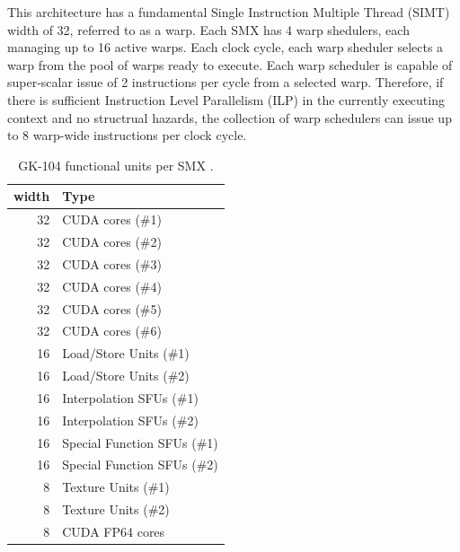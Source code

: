 \documentclass[11pt, oneside, a4paper]{article}
\begin{document}
This architecture has a fundamental Single Instruction Multiple Thread (SIMT) width of 32, referred to as a warp.
Each SMX has 4 warp shedulers, each managing up to 16 active warps. Each clock cycle, each warp sheduler selects a warp from the pool of warps ready to execute. Each warp scheduler is capable of super-scalar issue of 2 instructions per cycle from a selected warp. Therefore, if there is sufficient Instruction Level Parallelism (ILP) in the currently executing context and no structrual hazards, the collection of warp schedulers can issue up to 8 warp-wide instructions per clock cycle.


\begin{table}[tb]
	\caption{GK-104 functional units per SMX \cite{Anand}.}
	\label{tab:funcunits}
	\begin{center}
		\begin{tabular}{rl}
		\hline

		\hline
		\textbf{width} & \textbf{Type} \\
		\hline
			32 & CUDA cores (\#1) \\
			32 & CUDA cores (\#2) \\
			32 & CUDA cores (\#3) \\
			32 & CUDA cores (\#4) \\
			32 & CUDA cores (\#5) \\
			32 & CUDA cores (\#6) \\
			16 & Load/Store Units (\#1) \\
			16 & Load/Store Units (\#2) \\
			16 & Interpolation SFUs (\#1) \\
			16 & Interpolation SFUs (\#2) \\
			16 & Special Function SFUs (\#1) \\
			16 & Special Function SFUs (\#2) \\
			8 & Texture Units (\#1) \\
			8 & Texture Units (\#2) \\
			8 & CUDA FP64 cores \\
		\hline

		\hline
		\end{tabular}
	\end{center}
\end{table}
\end{document}

